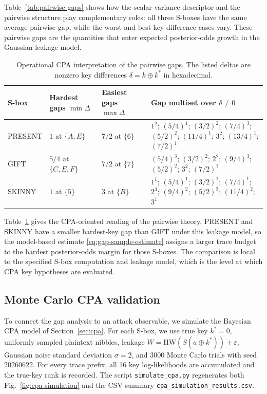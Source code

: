 \documentclass[referee,lineno,pdflatex,sn-mathphys-num]{sn-jnl}
\theoremstyle{thmstylethree}
\theoremstyle{thmstyletwo}
\theoremstyle{thmstyleone}
\newcommand{\HW}{\mathrm{HW}}
\begin{document}
Table~\ref{tab:pairwise-gaps} shows how the scalar variance descriptor and the
pairwise structure play complementary roles: all three S-boxes have the same
average pairwise gap, while the worst and best key-difference cases vary.
These pairwise gaps are the
quantities that enter expected posterior-odds growth in the Gaussian leakage
model.

\begin{table}[t]
\centering
\caption{Operational CPA interpretation of the pairwise gaps.  The listed
deltas are nonzero key differences $\delta=k\oplus k^*$ in hexadecimal.}
\label{tab:gap-distribution}
\scriptsize
\setlength{\tabcolsep}{2pt}
\begin{tabular}{@{}p{}p{}p{}p{}@{}}
\toprule
S-box & Hardest gaps $\min\Delta$ & Easiest gaps $\max\Delta$ &
Gap multiset over $\delta\neq0$ \\
\midrule
PRESENT & $1$ at $\{A,E\}$ & $7/2$ at $\{6\}$ &
$1^2$; $(5/4)^1$; $(3/2)^2$; $(7/4)^3$; $(5/2)^2$;
$(11/4)^1$; $3^2$; $(13/4)^1$; $(7/2)^1$ \\
GIFT & $5/4$ at $\{C,E,F\}$ & $7/2$ at $\{7\}$ &
$(5/4)^3$; $(3/2)^2$; $2^2$; $(9/4)^3$; $(5/2)^2$;
$3^2$; $(7/2)^1$ \\
SKINNY & $1$ at $\{5\}$ & $3$ at $\{B\}$ &
$1^1$; $(5/4)^1$; $(3/2)^1$; $(7/4)^1$; $2^3$;
$(9/4)^2$; $(5/2)^3$; $(11/4)^2$; $3^1$ \\
\bottomrule
\end{tabular}
\end{table}

Table~\ref{tab:gap-distribution} gives the CPA-oriented reading of the
pairwise theory.  PRESENT and SKINNY have a smaller hardest-key gap than GIFT
under this leakage model, so the model-based estimate
\eqref{eq:gap-sample-estimate} assigns a larger trace budget to the hardest
posterior-odds margin for those S-boxes.  The comparison is local to the
specified S-box computation and leakage model, which is the level at which CPA
key hypotheses are evaluated.

\subsection{Monte Carlo CPA validation}\label{subsec:cpa-simulation}

To connect the gap analysis to an attack observable, we simulate the Bayesian
CPA model of Section~\ref{sec:cpa}.  For each S-box, we use true key
$k^*=0$, uniformly sampled plaintext nibbles, leakage
$W=\HW(S(a\oplus k^*))+\varepsilon$, Gaussian noise standard deviation
$\sigma=2$, and $3000$ Monte Carlo trials with seed $20260622$.  For every
trace prefix, all 16 key log-likelihoods are accumulated and the true-key rank
is recorded.  The script \texttt{simulate\_cpa.py} regenerates both
Fig.~\ref{fig:cpa-simulation} and the CSV summary
\texttt{cpa\_simulation\_results.csv}.
\end{document}
